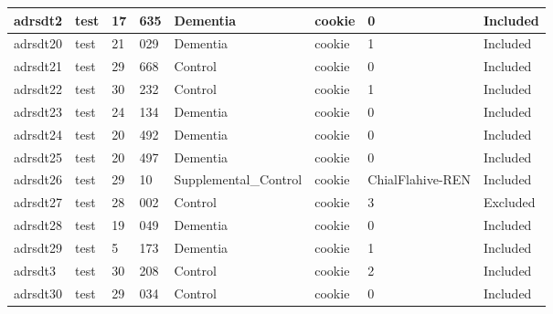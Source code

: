 \begin{center}
\begin{longtable}{|l|l|l|l|l|l|l|l|}
adrsdt2        & test                  & 17              & 635                & Dementia             & cookie          & 0                & Included      \\ \hline
adrsdt20       & test                  & 21              & 029                & Dementia             & cookie          & 1                & Included      \\ \hline
adrsdt21       & test                  & 29              & 668                & Control              & cookie          & 0                & Included      \\ \hline
adrsdt22       & test                  & 30              & 232                & Control              & cookie          & 1                & Included      \\ \hline
adrsdt23       & test                  & 24              & 134                & Dementia             & cookie          & 0                & Included      \\ \hline
adrsdt24       & test                  & 20              & 492                & Dementia             & cookie          & 0                & Included      \\ \hline
adrsdt25       & test                  & 20              & 497                & Dementia             & cookie          & 0                & Included      \\ \hline
adrsdt26       & test                  & 29              & 10                 & Supplemental\_Control & cookie          & ChialFlahive-REN & Included      \\ \hline
adrsdt27       & test                  & 28              & 002                & Control              & cookie          & 3                & Excluded      \\ \hline
adrsdt28       & test                  & 19              & 049                & Dementia             & cookie          & 0                & Included      \\ \hline
adrsdt29       & test                  & 5               & 173                & Dementia             & cookie          & 1                & Included      \\ \hline
adrsdt3        & test                  & 30              & 208                & Control              & cookie          & 2                & Included      \\ \hline
adrsdt30       & test                  & 29              & 034                & Control              & cookie          & 0                & Included      \\ \hline

\end{longtable}
\end{center}
